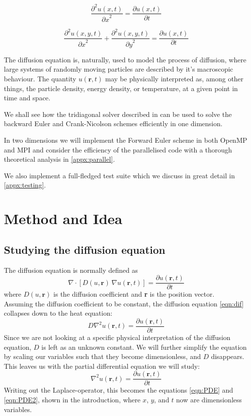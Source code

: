 \documentclass[10pt,a4paper]{article}
\newcommand{\pt}{{\partial t}}
\newcommand{\px}{{\partial x}}
\newcommand{\py}{{\partial y}}
\newcommand{\pu}{{\partial u}}
\newcommand{\ppu}{{\partial^2 u}}
\begin{document}
\begin{equation}\label{eqn:PDE}
\frac{\ppu(x,t)}{\px^2} = \frac{\pu(x,t)}{\pt}
\end{equation}

\begin{equation}\label{eqn:PDE2}
\frac{\ppu(x,y,t)}{\px^2} + \frac{\ppu(x,y,t)}{\py^2} = \frac{\pu(x,t)}{\pt}
\end{equation}


The diffusion equation is, naturally, used to model the process of diffusion, where large systems of randomly moving particles are described by it's macroscopic behaviour. The quantity $u(\textbf{r},t)$ may be physically interpreted as, among other things, the particle density, energy density, or temperature, at a given point in time and space.

We shall see how the tridiagonal solver described in \cite{hustad_lunde_project1} can be used to solve the backward Euler and Crank-Nicolson schemes efficiently in one dimension.

In two dimensions we will implement the Forward Euler scheme in both OpenMP and MPI and consider the efficiency of the parallelised code with a thorough theoretical analysis in \ref{appx:parallel}.

We also implement a full-fledged test suite which we discuss in great detail in \ref{appx:testing}.

\section{Method and Idea}

\subsection{Studying the diffusion equation}\label{sec:dif}

The diffusion equation is normally defined as
\begin{equation}\label{eqn:dif}
\nabla \cdot \left[D(u,\textbf{r}) \ \nabla u(\textbf{r},t)\right] = \frac{\pu(\textbf{r},t)}{\pt}
\end{equation}
where $D(u,\textbf{r})$ is the diffusion coefficient and \textbf{r} is the position vector.
\\
Assuming the diffusion coefficient to be constant, the diffusion equation \vref{eqn:dif} collapses down to the heat equation:
\begin{equation}
D \nabla^2 u(\textbf{r},t) = \frac{\pu(\textbf{r},t)}{\pt}
\end{equation}
Since we are not looking at a specific physical interpretation of the diffusion equation, $D$ is left as an unknown constant. We will further simplify the equation by scaling our variables such that they become dimensionless, and $D$ disappears. This leaves us with the partial differential equation we will study:
\begin{equation}\label{eq:dif_simple}
\nabla^2 u(\textbf{r},t) = \frac{\pu(\textbf{r},t)}{\pt}
\end{equation}
Writing out the Laplace-operator, this becomes the equations \ref{eqn:PDE} and \ref{eqn:PDE2}, shown in the introduction, where $x$, $y$, and $t$ now are dimensionless variables.
\end{document}
